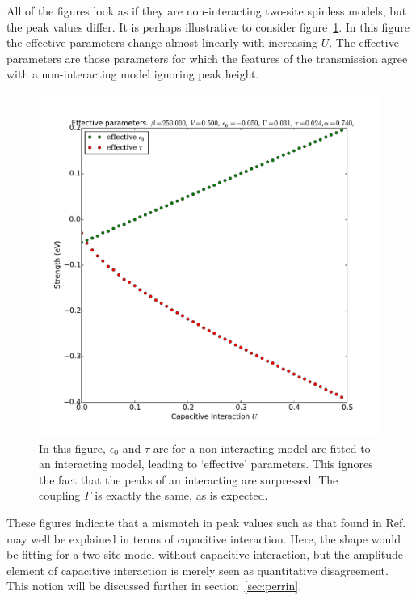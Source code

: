 All of the figures look as if they are non-interacting two-site spinless models, but the peak values differ. It is perhaps illustrative to consider figure~\ref{fig:perrin_effective}. In this figure the effective parameters change almost linearly with increasing $U$. The effective parameters are those parameters for which the features of the transmission agree with a non-interacting model ignoring peak height.
\begin{figure}[!bt]
    \centering
    \includegraphics[height=.35\textheight]{pdf/trans/perrin_effective.pdf}
    \caption{In this figure, $\epsilon_0$ and $\tau$ are for a non-interacting model are fitted to an interacting model, leading to `effective' parameters. This ignores the fact that the peaks of an interacting are surpressed. The coupling $\Gamma$ is exactly the same, as is expected.}
    \label{fig:perrin_effective}
\end{figure}


These figures indicate that a mismatch in peak values such as that found in Ref.~\cite{perrinnano} may well be explained in terms of capacitive interaction. Here, the shape would be fitting for a two-site model without capacitive interaction, but the amplitude element of capacitive interaction is merely seen as quantitative disagreement. This notion will be discussed further in section~\ref{sec:perrin}. 

